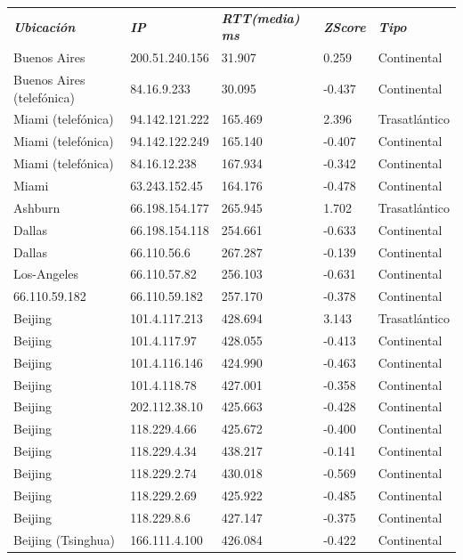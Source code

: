 \begin{tabular}{lllll}
	\textit{\textbf{Ubicaci\'on}}	&	\textit{\textbf{IP}}	&	\textit{\textbf{RTT(media) ms}}	&	\textit{\textbf{ZScore}}	&	\textit{\textbf{Tipo}}	\\
	Buenos Aires			&	200.51.240.156	&	31.907	&	0.259	&	Continental	\\
	Buenos Aires (telef\'onica)	&	84.16.9.233	&	30.095	&	-0.437	&	Continental	\\
	Miami (telef\'onica)		&	94.142.121.222	&	165.469	&	2.396	&	Trasatl\'antico	\\
	Miami (telef\'onica)		&	94.142.122.249	&	165.140	&	-0.407	&	Continental	\\
	Miami (telef\'onica)		&	84.16.12.238	&	167.934	&	-0.342	&	Continental	\\
	Miami 				&	63.243.152.45	&	164.176	&	-0.478	&	Continental	\\
	Ashburn				&	66.198.154.177	&	265.945	&	1.702	&	Trasatl\'antico	\\
	Dallas				&	66.198.154.118	&	254.661	&	-0.633	&	Continental	\\
	Dallas				&	66.110.56.6	&	267.287	&	-0.139	&	Continental	\\
	Los-Angeles			&	66.110.57.82	&	256.103	&	-0.631	&	Continental	\\
	66.110.59.182			&	66.110.59.182	&	257.170	&	-0.378	&	Continental	\\
	Beijing				&	101.4.117.213	&	428.694	&	3.143	&	Trasatl\'antico	\\
	Beijing				&	101.4.117.97	&	428.055	&	-0.413	&	Continental	\\
	Beijing				&	101.4.116.146	&	424.990	&	-0.463	&	Continental	\\
	Beijing				&	101.4.118.78	&	427.001	&	-0.358	&	Continental	\\
	Beijing				&	202.112.38.10	&	425.663	&	-0.428	&	Continental	\\
	Beijing				&	118.229.4.66	&	425.672	&	-0.400	&	Continental	\\
	Beijing				&	118.229.4.34	&	438.217	&	-0.141	&	Continental	\\
	Beijing				&	118.229.2.74	&	430.018	&	-0.569	&	Continental	\\
	Beijing				&	118.229.2.69	&	425.922	&	-0.485	&	Continental	\\
	Beijing				&	118.229.8.6	&	427.147	&	-0.375	&	Continental	\\
	Beijing (Tsinghua)		&	166.111.4.100	&	426.084	&	-0.422	&	Continental	\\

\end{tabular}

